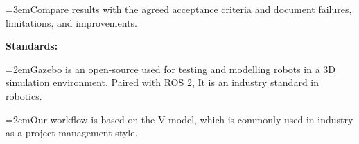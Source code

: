 \documentclass[12pt,a4paper]{article}
\begin{document}
\par\noindent\hangindent=3em\hspace*{2em}\textbullet\hspace{0.5em}Compare results with the agreed acceptance criteria and document failures, limitations, and improvements.\par
\noindent \textbf{Standards:}\par
\par\noindent\hangindent=2em\hspace*{1em}\textbullet\hspace{0.5em}Gazebo is an open-source used for testing and modelling robots in a 3D simulation environment. Paired with ROS 2, It is an industry standard in robotics.\par
\par\noindent\hangindent=2em\hspace*{1em}\textbullet\hspace{0.5em}Our workflow is based on the V-model, which is commonly used in industry as a project management style.\par
\end{document}
